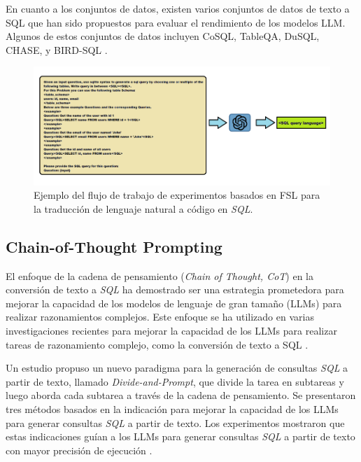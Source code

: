 En cuanto a los conjuntos de datos, existen varios conjuntos de datos de texto a SQL que han sido propuestos para evaluar el rendimiento de los modelos LLM. Algunos de estos conjuntos de datos incluyen CoSQL, TableQA, DuSQL, CHASE, y BIRD-SQL \cite{wikisql} \cite{CoSQL} \cite{TableQA} \cite{DuSQL} \cite{CHASE} \cite{BIRD-SQL}.

\begin{figure}[H]\label{fslpromtpsql}
	\centering
	\includegraphics[width = 1\textwidth]{./Graphics/fslpromptsql}
	\caption{Ejemplo del flujo de trabajo de experimentos basados en FSL para la traducción de lenguaje natural a código en \textit{SQL}.}
\end{figure}

\subsection{Chain-of-Thought Prompting} \label{llm_approach_cot}

El enfoque de la cadena de pensamiento (\textit{Chain of Thought, CoT}) \cite{cot} en la conversión de texto a \textit{SQL} ha demostrado ser una estrategia prometedora para mejorar la capacidad de los modelos de lenguaje de gran tamaño (LLMs) para realizar razonamientos complejos. Este enfoque se ha utilizado en varias investigaciones recientes para mejorar la capacidad de los LLMs para realizar tareas de razonamiento complejo, como la conversión de texto a SQL \cite{cotllmssql1}.

Un estudio propuso un nuevo paradigma para la generación de consultas \textit{SQL} a partir de texto, llamado \textit{Divide-and-Prompt}, que divide la tarea en subtareas y luego aborda cada subtarea a través de la cadena de pensamiento. Se presentaron tres métodos basados en la indicación para mejorar la capacidad de los LLMs para generar consultas \textit{SQL} a partir de texto. Los experimentos mostraron que estas indicaciones guían a los LLMs para generar consultas \textit{SQL} a partir de texto con mayor precisión de ejecución \cite{cotllmssql2}.

